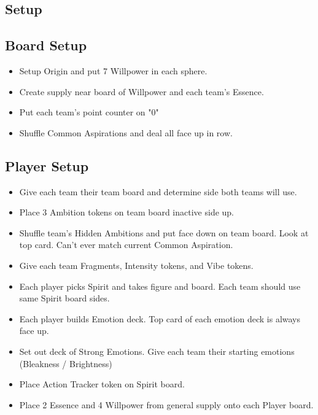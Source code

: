 \documentclass[10pt]{article}
\newenvironment{itemizeCustom}
{\begin{itemize}
  \setlength{\itemsep}{1pt}
  \setlength{\parskip}{0pt}
  \setlength{\parsep}{0pt}}
{\end{itemize}}
\begin{document}
\begin{multicols*}{2}

\section*{Setup}
\subsection*{Board Setup}
\begin{itemizeCustom}
    \item Setup Origin and put 7 Willpower in each sphere.
    \item Create supply near board of Willpower and each team's Essence.
    \item Put each team's point counter on "0"
    \item Shuffle Common Aspirations and deal all face up in row.
\end{itemizeCustom}

\subsection*{Player Setup}
\begin{itemizeCustom}
    \item Give each team their team board and determine side both teams will use.
    \item Place 3 Ambition tokens on team board inactive side up.
    \item Shuffle team's Hidden Ambitions and put face down on team board. Look at top card. Can't ever match current Common Aspiration.
    \item Give each team Fragments, Intensity tokens, and Vibe tokens.
    \item Each player picks Spirit and takes figure and board. Each team should use same Spirit board sides.
    \item Each player builds Emotion deck. Top card of each emotion deck is always face up.
    \item Set out deck of Strong Emotions. Give each team their starting emotions (Bleakness / Brightness)
    \item Place Action Tracker token on Spirit board.
    \item Place 2 Essence and 4 Willpower from general supply onto each Player board.
\end{itemizeCustom}


\end{multicols*}
\end{document}
